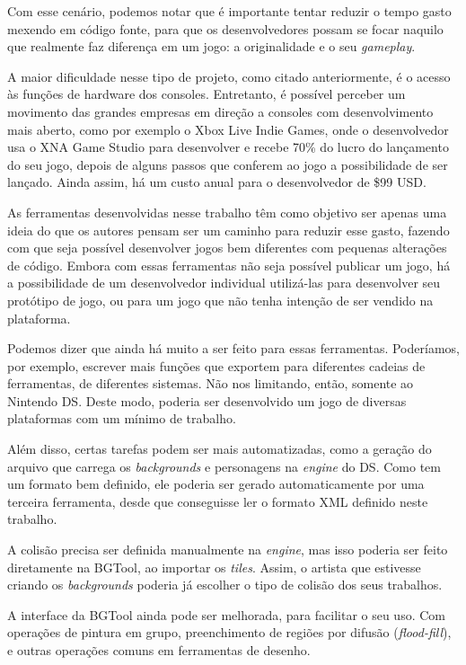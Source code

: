 \documentclass[brazil]{abnt}
\begin{document}
Com esse cenário, podemos notar que é importante tentar reduzir o tempo gasto mexendo em código fonte, para que os desenvolvedores possam se focar naquilo que realmente faz diferença em um jogo: a originalidade e o seu \textit{gameplay}.

A maior dificuldade nesse tipo de projeto, como citado anteriormente, é o acesso às funções de hardware dos consoles. Entretanto, é possível perceber um movimento das grandes empresas em direção a consoles com desenvolvimento mais aberto, como por exemplo o Xbox Live Indie Games, onde o desenvolvedor usa o XNA Game Studio para desenvolver e recebe 70\% do lucro do lançamento do seu jogo, depois de alguns passos que conferem ao jogo a possibilidade de ser lançado. Ainda assim, há um custo anual para o desenvolvedor de \$99 USD. \cite{XNAAppHub} 

As ferramentas desenvolvidas nesse trabalho têm como objetivo ser apenas uma ideia do que os autores pensam ser um caminho para reduzir esse gasto, fazendo com que seja possível desenvolver jogos bem diferentes com pequenas alterações de código. Embora com essas ferramentas não seja possível publicar um jogo, há a possibilidade de um desenvolvedor individual utilizá-las para desenvolver seu protótipo de jogo, ou para um jogo que não tenha intenção de ser vendido na plataforma.

Podemos dizer que ainda há muito a ser feito para essas ferramentas. Poderíamos, por exemplo, escrever mais funções que exportem para diferentes cadeias de ferramentas, de diferentes sistemas. Não nos limitando, então, somente ao Nintendo DS. Deste modo, poderia ser desenvolvido um jogo de diversas plataformas com um mínimo de trabalho.

Além disso, certas tarefas podem ser mais automatizadas, como a geração do arquivo que carrega os \textit{backgrounds} e personagens na \textit{engine} do DS. Como tem um formato bem definido, ele poderia ser gerado automaticamente por uma terceira ferramenta, desde que conseguisse ler o formato XML definido neste trabalho.


A colisão precisa ser definida manualmente na \textit{engine}, mas isso poderia ser feito diretamente na BGTool, ao importar os \textit{tiles}. Assim, o artista que estivesse criando os \textit{backgrounds} poderia já escolher o tipo de colisão dos seus trabalhos.

A interface da BGTool ainda pode ser melhorada, para facilitar o seu uso. Com operações de pintura em grupo, preenchimento de regiões por difusão (\textit{flood-fill}), e outras operações comuns em ferramentas de desenho.
\end{document}
